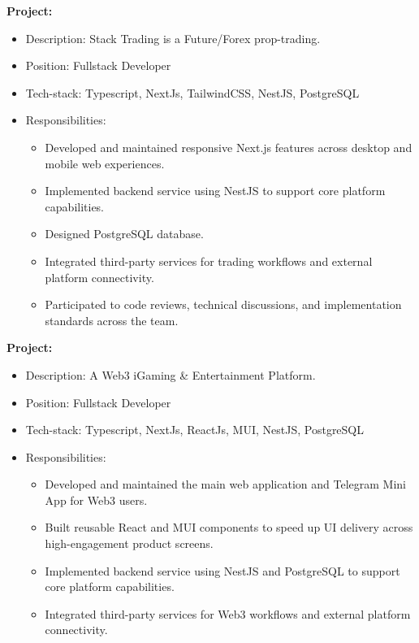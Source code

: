\documentclass[a4paper, 11pt]{article}
\newcommand{\projectHeading}[1]{%
\textbf{Project:} \text{#1}%
\vspace{-3.0mm}%
}
\newcommand{\responsibilities}{%
\item{Responsibilities:}%
\begin{itemize}[leftmargin=6ex,noitemsep,labelsep=1mm,itemsep=0mm,label={·}]\small%
}
\newcommand{\responsibilitiesEnd}{\end{itemize}}
\newcommand{\resumeItemListStart}{\begin{justify}\begin{itemize}[leftmargin=3ex,
rightmargin=2ex, noitemsep,labelsep=1.2mm,itemsep=0mm]\small}
\newcommand{\resumeItemListEnd}{\end{itemize}\end{justify}
\vspace{-2mm}}
\begin{document}
\projectHeading{StackTrading}
\resumeItemListStart
\item {Description: Stack Trading is a Future/Forex prop-trading.}
\item {Position: Fullstack Developer}
\item {Tech-stack: Typescript, NextJs, TailwindCSS, NestJS, PostgreSQL}
\responsibilities
\item {Developed and maintained responsive Next.js features across desktop and mobile web experiences.}
\item {Implemented backend service using NestJS to support core platform capabilities.}
\item {Designed PostgreSQL database.}
\item {Integrated third-party services for trading workflows and external platform connectivity.}
\item {Participated to code reviews, technical discussions, and implementation standards across the team.}
\responsibilitiesEnd
\resumeItemListEnd


\projectHeading{Mint}
\resumeItemListStart
\item {Description: A Web3 iGaming \& Entertainment Platform.}
\item {Position: Fullstack Developer}
\item {Tech-stack: Typescript, NextJs, ReactJs, MUI, NestJS, PostgreSQL}
\responsibilities
\item {Developed and maintained the main web application and Telegram Mini App for Web3 users.}
\item {Built reusable React and MUI components to speed up UI delivery across high-engagement product screens.}
\item {Implemented backend service using NestJS and PostgreSQL to support core platform capabilities.}
\item {Integrated third-party services for Web3 workflows and external platform connectivity.}
\responsibilitiesEnd
\resumeItemListEnd
\vspace{3.0mm}
\end{document}
